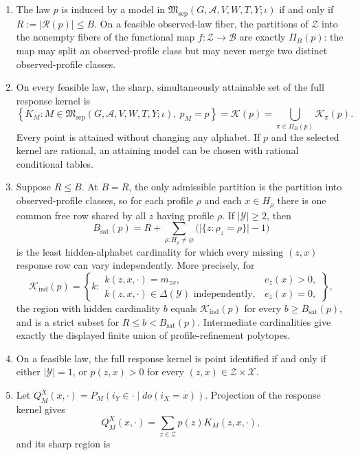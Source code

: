 \begin{enumerate}
\item The law \(p\) is induced by a model in
\(\mathfrak M_{\mathrm{sep}}(G,\mathcal A,V,W,T,Y;\iota)\) if and only if
\(R:=\lvert\mathcal R(p)\rvert\leq B\).  On a feasible observed-law
fiber, the partitions of \(\mathcal Z\) into the nonempty fibers of the
functional map \(f:\mathcal Z\to\mathcal B\) are exactly
\(\Pi_B(p)\): the map may split an observed-profile class but may never
merge two distinct observed-profile classes.
\item On every feasible law, the sharp, simultaneously attainable set of
the full response kernel is
\[
 \left\{K_M:M\in
 \mathfrak M_{\mathrm{sep}}(G,\mathcal A,V,W,T,Y;\iota),\ p_M=p\right\}
 =\mathcal K(p)
 =\bigcup_{\pi\in\Pi_B(p)}\mathcal K_\pi(p).
\]
Every point is attained without changing any alphabet.  If \(p\) and the
selected kernel are rational, an attaining model can be chosen with
rational conditional tables.
\item Suppose \(R\leq B\).  At \(B=R\), the only admissible partition is
the partition into observed-profile classes, so for each profile \(\rho\)
and each \(x\in H_\rho\) there is one common free row shared by all
\(z\) having profile \(\rho\).  If \(\lvert\mathcal Y\rvert\geq2\), then
\[
 B_{\mathrm{sat}}(p)
 =R+\sum_{\rho:H_\rho\ne\varnothing}
 \bigl(\lvert\{z:\rho_z=\rho\}\rvert-1\bigr)
\]
is the least hidden-alphabet cardinality for which every missing
\((z,x)\) response row can vary independently.  More precisely, for
\[
 \mathcal K_{\mathrm{ind}}(p)
 =\left\{k:
 \begin{array}{ll}
 k(z,x,\cdot)=m_{zx},&e_z(x)>0,\\
 k(z,x,\cdot)\in\Delta(\mathcal Y)\text{ independently},&e_z(x)=0,
 \end{array}\right\},
\]
the region with hidden cardinality \(b\) equals
\(\mathcal K_{\mathrm{ind}}(p)\) for every
\(b\geq B_{\mathrm{sat}}(p)\), and is a strict subset for
\(R\leq b<B_{\mathrm{sat}}(p)\).  Intermediate cardinalities give exactly
the displayed finite union of profile-refinement polytopes.
\item On a feasible law, the full response kernel is point identified if
and only if either \(\lvert\mathcal Y\rvert=1\), or
\(p(z,x)>0\) for every \((z,x)\in\mathcal Z\times\mathcal X\).
\item Let \(Q_M^X(x,\cdot)=P_M(i_Y\in\cdot\mid do(i_X=x))\).  Projection
of the response kernel gives
\[
 Q_M^X(x,\cdot)=\sum_{z\in\mathcal Z}p(z)K_M(z,x,\cdot),
\]
and its sharp region is

\end{enumerate}
